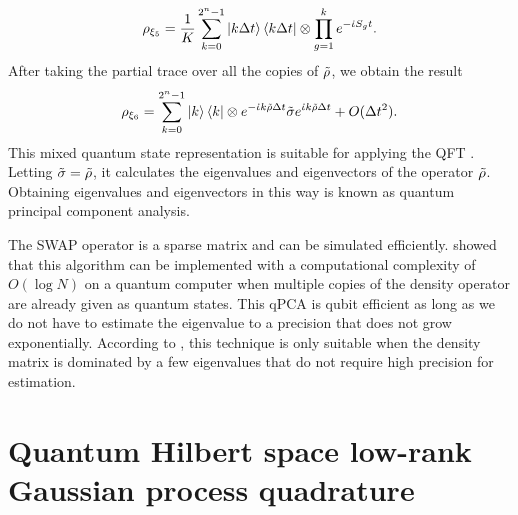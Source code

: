 \documentclass[10pt]{article}
\begin{document}
	\begin{equation}
		\rho_{\xi_5}= \frac{1}{K}\sum_{k=0}^{2^{n}-1}\ket{k\Delta t}\bra{k\Delta t} \otimes \prod_{g=1}^{k}e^{-\dot{\iota}S_{g}t}.
	\end{equation}
	After taking the partial trace over all the copies of $\Tilde{\rho}$, we obtain the result
	\begin{equation}
		\rho_{\xi_6}= \sum_{k=0}^{2^{n}-1}\ket{k}\bra{k} \otimes e^{-\dot{\iota} k \Tilde{\rho} \Delta t} {\tilde{\sigma}} e^{\dot{\iota} k \Tilde{\rho} \Delta t} +O(\Delta t^{2}).
	\end{equation}
	This mixed quantum state representation is suitable for applying the QFT \citep{Schuld2021QML}. Letting ${\tilde{\sigma}}=\Tilde{\rho}$, it calculates the eigenvalues and eigenvectors of the operator $\Tilde{\rho}$. Obtaining eigenvalues and eigenvectors in this way is known as quantum principal component analysis.  
	
	The SWAP operator is a sparse matrix and can be simulated efficiently. \citet{Lloyd2014QPCA} showed that this algorithm can be implemented with a computational complexity of $O(\log N)$ on a quantum computer when multiple copies of the density operator are already given as quantum states. This qPCA is qubit efficient as long as we do not have to estimate the eigenvalue to a precision that does not grow exponentially. According to \citet{Lloyd2014QPCA}, this technique is only suitable when the density matrix is dominated by a few eigenvalues that do not require high precision for estimation.  
	
	
	
	
	\section{\label{sec: Quantum GPQ} Quantum Hilbert space low-rank Gaussian process quadrature}
	
\end{document}

